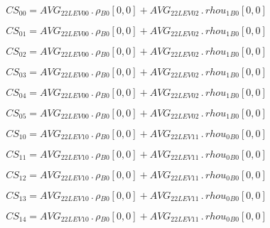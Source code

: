 \documentclass{article}
\begin{document}
\begin{dmath}CS_{00} = AVG_{2 2 LEV 00} \,.\, {\rho{_{B0}}}[{0,0}] + AVG_{2 2 LEV 02} \,.\, {rhou_{1}{_{B0}}}[{0,0}]\end{dmath}

\begin{dmath}CS_{01} = AVG_{2 2 LEV 00} \,.\, {\rho{_{B0}}}[{0,0}] + AVG_{2 2 LEV 02} \,.\, {rhou_{1}{_{B0}}}[{0,0}]\end{dmath}

\begin{dmath}CS_{02} = AVG_{2 2 LEV 00} \,.\, {\rho{_{B0}}}[{0,0}] + AVG_{2 2 LEV 02} \,.\, {rhou_{1}{_{B0}}}[{0,0}]\end{dmath}

\begin{dmath}CS_{03} = AVG_{2 2 LEV 00} \,.\, {\rho{_{B0}}}[{0,0}] + AVG_{2 2 LEV 02} \,.\, {rhou_{1}{_{B0}}}[{0,0}]\end{dmath}

\begin{dmath}CS_{04} = AVG_{2 2 LEV 00} \,.\, {\rho{_{B0}}}[{0,0}] + AVG_{2 2 LEV 02} \,.\, {rhou_{1}{_{B0}}}[{0,0}]\end{dmath}

\begin{dmath}CS_{05} = AVG_{2 2 LEV 00} \,.\, {\rho{_{B0}}}[{0,0}] + AVG_{2 2 LEV 02} \,.\, {rhou_{1}{_{B0}}}[{0,0}]\end{dmath}

\begin{dmath}CS_{10} = AVG_{2 2 LEV 10} \,.\, {\rho{_{B0}}}[{0,0}] + AVG_{2 2 LEV 11} \,.\, {rhou_{0}{_{B0}}}[{0,0}]\end{dmath}

\begin{dmath}CS_{11} = AVG_{2 2 LEV 10} \,.\, {\rho{_{B0}}}[{0,0}] + AVG_{2 2 LEV 11} \,.\, {rhou_{0}{_{B0}}}[{0,0}]\end{dmath}

\begin{dmath}CS_{12} = AVG_{2 2 LEV 10} \,.\, {\rho{_{B0}}}[{0,0}] + AVG_{2 2 LEV 11} \,.\, {rhou_{0}{_{B0}}}[{0,0}]\end{dmath}

\begin{dmath}CS_{13} = AVG_{2 2 LEV 10} \,.\, {\rho{_{B0}}}[{0,0}] + AVG_{2 2 LEV 11} \,.\, {rhou_{0}{_{B0}}}[{0,0}]\end{dmath}

\begin{dmath}CS_{14} = AVG_{2 2 LEV 10} \,.\, {\rho{_{B0}}}[{0,0}] + AVG_{2 2 LEV 11} \,.\, {rhou_{0}{_{B0}}}[{0,0}]\end{dmath}
\end{document}
